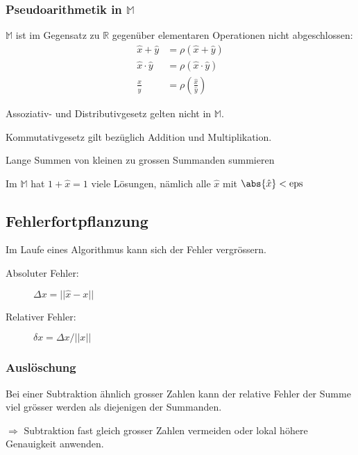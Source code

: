 		\subsubsection{Pseudoarithmetik in $\mathbb{M}$} $\mathbb{M}$ ist im Gegensatz zu $\mathbb{R}$ gegenüber elementaren Operationen nicht abgeschlossen:
			\begin{align*}
				\hat x + \hat y &= \rho(\hat x + \hat y) \\
				\hat x \cdot \hat y &= \rho(\hat x \cdot \hat y) \\
				\frac{\hat x}{\hat y} &= \rho\left(\frac{\hat x}{\hat y}\right)
			\end{align*}

			\begin{regeln}
				\item Assoziativ- und Distributivgesetz gelten nicht in $\mathbb{M}$.
				\item Kommutativgesetz gilt bezüglich Addition und Multiplikation.
			\end{regeln}

			\begin{folgerungen}
				\item Lange Summen von kleinen zu grossen Summanden summieren
				\item Im $\mathbb M$ hat $1 + \hat x = 1$ viele Lösungen, nämlich alle $\hat x$ mit $\abs{\hat x} < \mathrm{eps}$
			\end{folgerungen}

	\subsection{Fehlerfortpflanzung}
		Im Laufe eines Algorithmus kann sich der Fehler vergrössern.

		\begin{description}
			\item[Absoluter Fehler:] $\Delta x = ||\hat x - x||$
			\item[Relativer Fehler:] $\delta x = \Delta x / ||x||$
		\end{description}

		\subsubsection{Auslöschung}
			Bei einer Subtraktion ähnlich grosser Zahlen kann der relative Fehler der Summe viel grösser werden als diejenigen der Summanden.

			$\Rightarrow$ Subtraktion fast gleich grosser Zahlen vermeiden oder lokal höhere Genauigkeit anwenden.


